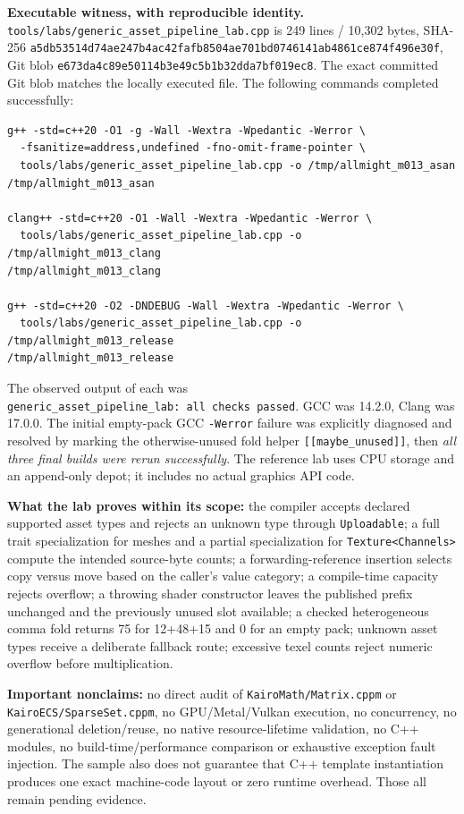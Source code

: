 \textbf{Executable witness, with reproducible identity.} \texttt{tools/labs/generic\_asset\_pipeline\_lab.cpp} is 249 lines / 10,302 bytes, SHA-256 \texttt{a5db53514d74ae247b4ac42fafb8504ae701bd0746141ab4861ce874f496e30f}, Git blob \texttt{e673da4c89e50114b3e49c5b1b32dda7bf019ec8}. The exact committed Git blob matches the locally executed file. The following commands completed successfully:

\begin{verbatim}
g++ -std=c++20 -O1 -g -Wall -Wextra -Wpedantic -Werror \
  -fsanitize=address,undefined -fno-omit-frame-pointer \
  tools/labs/generic_asset_pipeline_lab.cpp -o /tmp/allmight_m013_asan
/tmp/allmight_m013_asan

clang++ -std=c++20 -O1 -Wall -Wextra -Wpedantic -Werror \
  tools/labs/generic_asset_pipeline_lab.cpp -o /tmp/allmight_m013_clang
/tmp/allmight_m013_clang

g++ -std=c++20 -O2 -DNDEBUG -Wall -Wextra -Wpedantic -Werror \
  tools/labs/generic_asset_pipeline_lab.cpp -o /tmp/allmight_m013_release
/tmp/allmight_m013_release
\end{verbatim}

The observed output of each was \texttt{generic\_asset\_pipeline\_lab:\ all\ checks\ passed}. GCC was 14.2.0, Clang was 17.0.0. The initial empty-pack GCC \texttt{-Werror} failure was explicitly diagnosed and resolved by marking the otherwise-unused fold helper \texttt{{[}{[}maybe\_unused{]}{]}}, then \emph{all three final builds were rerun successfully}. The reference lab uses CPU storage and an append-only depot; it includes no actual graphics API code.

\textbf{What the lab proves within its scope:} the compiler accepts declared supported asset types and rejects an unknown type through \texttt{Uploadable}; a full trait specialization for meshes and a partial specialization for \texttt{Texture\textless{}Channels\textgreater{}} compute the intended source-byte counts; a forwarding-reference insertion selects copy versus move based on the caller's value category; a compile-time capacity rejects overflow; a throwing shader constructor leaves the published prefix unchanged and the previously unused slot available; a checked heterogeneous comma fold returns 75 for 12+48+15 and 0 for an empty pack; unknown asset types receive a deliberate fallback route; excessive texel counts reject numeric overflow before multiplication.

\textbf{Important nonclaims:} no direct audit of \texttt{KairoMath/Matrix.cppm} or \texttt{KairoECS/SparseSet.cppm}, no GPU/Metal/Vulkan execution, no concurrency, no generational deletion/reuse, no native resource-lifetime validation, no C++ modules, no build-time/performance comparison or exhaustive exception fault injection. The sample also does not guarantee that C++ template instantiation produces one exact machine-code layout or zero runtime overhead. Those all remain pending evidence.

